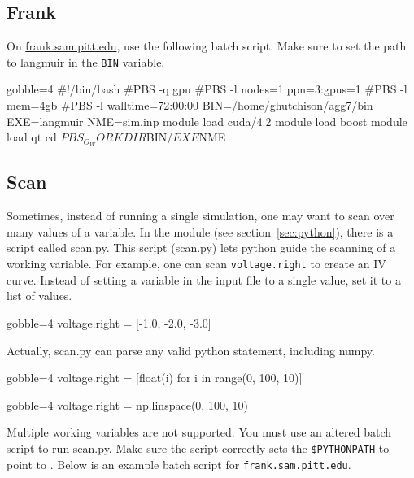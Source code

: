 \newpage
\subsection{Frank}
On \url{frank.sam.pitt.edu}, use the following batch script.
Make sure to set the path to langmuir in the \verb|BIN| variable.

\begin{bashcode*}{gobble=4}
    #!/bin/bash
    #PBS -q gpu
    #PBS -l nodes=1:ppn=3:gpus=1
    #PBS -l mem=4gb
    #PBS -l walltime=72:00:00
    BIN=/home/ghutchison/agg7/bin
    EXE=langmuir
    NME=sim.inp
    module load cuda/4.2
    module load boost
    module load qt
    cd $PBS_O_WORKDIR
    $BIN/$EXE $NME
\end{bashcode*}

\subsection{Scan}
Sometimes, instead of running a single \langmuir simulation, one may want
    to scan over many values of a variable.
In the \LangmuirPython module (see section~\ref{sec:python}), there is a script
    called scan.py.
This script (scan.py) lets python guide the scanning of a working variable.
For example, one can scan \verb|voltage.right| to create an IV curve.
Instead of setting a variable in the input file to a single value, set it to
    a list of values.
\begin{bashcode*}{gobble=4}
    voltage.right = [-1.0, -2.0, -3.0]
\end{bashcode*}
Actually, scan.py can parse any valid python statement, including numpy.
\begin{bashcode*}{gobble=4}
    voltage.right = [float(i) for i in range(0, 100, 10)]
\end{bashcode*}
\begin{bashcode*}{gobble=4}
    voltage.right = np.linspace(0, 100, 10)
\end{bashcode*}
Multiple working variables are not supported.
You must use an altered batch script to run scan.py.
Make sure the script correctly sets the \verb|$PYTHONPATH| to point to
    \LangmuirPython.
Below is an example batch script for \verb|frank.sam.pitt.edu|.
